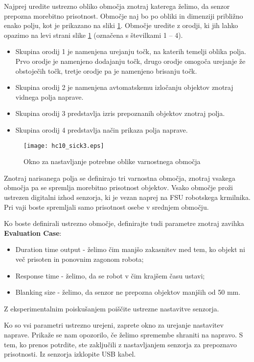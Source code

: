 Najprej uredite ustrezno obliko območja znotraj katerega želimo, da senzor prepozna morebitno prisotnost. Območje naj bo po obliki in dimenziji približno enako polju, kot je prikazano na sliki \ref{fig:hc10_sick3}. Območje uredite z orodji, ki jih lahko opazimo na levi strani slike \ref{fig:hc10_sick3} (označena s številkami 1 -- 4).
\begin{itemize}
	\item Skupina orodij 1 je namenjena urejanju točk, na katerih temelji oblika polja. Prvo orodje je namenjeno dodajanju točk, drugo orodje omogoča urejanje že obstoječih točk, tretje orodje pa je namenjeno brisanju točk.
	\item Skupina orodij 2 je namenjena avtomatskemu izločanju objektov znotraj vidnega polja naprave.
	\item Skupina orodij 3 predstavlja izris prepoznanih objektov znotraj polja.
	\item Skupina orodij 4 predstavlja način prikaza polja naprave.
\end{itemize}

\begin{figure}[!hbt]
	\centering
	\texttt{[image: hc10\_sick3.eps]}
	\caption{Okno za nastavljanje potrebne oblike varnostnega območja}
	\label{fig:hc10_sick3}
\end{figure}

Znotraj narisanega polja se definirajo tri varnostna območja, znotraj vsakega območja pa se spremlja morebitno prisotnost objektov. Vsako območje pro\v zi ustrezen digitalni izhod senzorja, ki je vezan naprej na FSU robotskega krmilnika. Pri vaji boste spremljali samo prisotnost osebe v srednjem območju.

Ko boste definirali ustrezno območje, definirajte tudi parametre znotraj zavihka \textbf{Evaluation Case}:
\begin{itemize}
	\item Duration time output - \v zelimo čim manjšo zakasnitev med tem, ko objekt ni več prisoten in ponovnim zagonom robota;
	\item Response time - \v zelimo, da se robot v čim krajšem času ustavi;
	\item Blanking size - \v zelimo, da senzor ne prepozna objektov manjših od 50 mm.
\end{itemize}

Z eksperimentalnim poiskušanjem poiščite ustrezne nastavitve senzorja.

Ko so vsi parametri ustrezno urejeni, zaprete okno za urejanje nastavitev naprave. Prikaže se nam opozorilo, če želimo spremembe shraniti na napravo. S tem, ko prenos potrdite, ste zaključili z nastavljanjem senzorja za prepoznavo prisotnosti. Iz senzorja izklopite USB kabel.

